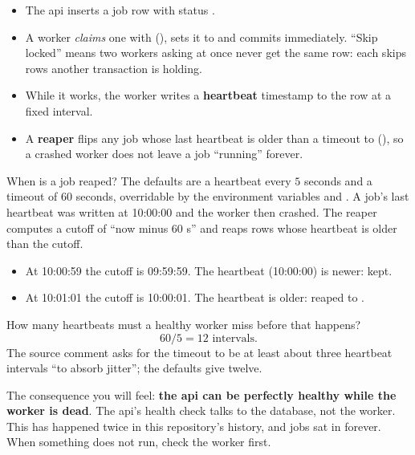\begin{itemize}
\item The api inserts a job row with status .
\item A worker \emph{claims} one with 
(), sets it to  and commits immediately.
``Skip locked'' means two workers asking at once never get the same row: each skips rows another
transaction is holding.
\item While it works, the worker writes a \textbf{heartbeat} timestamp to the row
at a fixed interval.
\item A \textbf{reaper} flips any  job whose last heartbeat is older
than a timeout to  (), so a crashed worker
does not leave a job ``running'' forever.
\end{itemize}

\begin{worked}[label={we:product:heartbeat}]{When is a job reaped?}
The defaults are a heartbeat every $5$ seconds and a timeout of $60$ seconds,
overridable by the environment variables  and
. A job's last heartbeat was written at 10:00:00 and the worker
then crashed. The reaper computes a cutoff of ``now minus $60$ s'' and reaps rows whose heartbeat is
older than the cutoff.
\begin{itemize}
\item At 10:00:59 the cutoff is 09:59:59. The heartbeat (10:00:00) is newer: kept.
\item At 10:01:01 the cutoff is 10:00:01. The heartbeat is older: reaped to .
\end{itemize}
How many heartbeats must a healthy worker miss before that happens?
\[ 60 / 5 = 12 \text{ intervals.} \]
The source comment asks for the timeout to be at least about three heartbeat intervals ``to absorb
jitter''; the defaults give twelve.
\end{worked}

The consequence you will feel: \textbf{the api can be perfectly healthy while the worker is dead}.
The api's health check talks to the database, not the worker. This has happened twice in this
repository's history, and jobs sat in  forever. When something does not run, check
the worker first.

